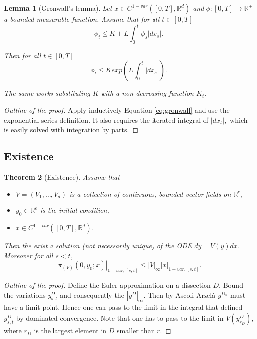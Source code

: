 \documentclass{article}
\newcommand{\R}{\mathbb{R}}
\newtheorem{theorem}{Theorem}
\newtheorem{lemma}[theorem]{Lemma}
\begin{document}
\begin{lemma}[Gronwall's lemma]
    Let $x \in C^{1-var}([0,T], \R^d)$ and $\phi:[0,T] \rightarrow \R^+$ a bounded measurable function. Assume that for all $t \in [0,T]$
    \begin{equation}\label{eq:gronwall}
        \phi_t \leq K + L \int_0^t \phi_s |dx_s|.
    \end{equation}

    Then for all $t \in [0,T]$
    \begin{equation}
        \phi_t \leq K exp\left( L \int_0^t |dx_s| \right).
    \end{equation}

    The same works substituting $K$ with a non-decreasing function $K_t.$
\end{lemma}
\begin{proof}[Outline of the proof]
    Apply inductively Equation \eqref{eq:gronwall} and use the exponential series definition.
    It also requires the iterated integral of $|dx_t|,$ which is easily solved with integration by parts.
\end{proof}

\subsection{Existence}

\begin{theorem}[Existence]
    Assume that
    \begin{itemize}
        \item $V = (V_1, \ldots, V_d)$ is a collection of continuous, bounded vector fields on $\R^e$,
        \item $y_0 \in \R^e$ is the initial condition,
        \item $x \in C^{1-var}([0,T], \R^d)$.
    \end{itemize}
    Then the exist a solution (not necessarily unique) of the ODE $dy = V(y)dx$.
    Moreover for all $s < t$,
    \begin{equation}
        |\pi_{(V)}(0, y_0; x)|_{1-var, [s,t]} \leq |V|_\infty |x|_{1-var, [s,t]}.
    \end{equation}
\end{theorem}
\begin{proof}[Outline of the proof]
    Define the Euler approximation on a dissection $D$.
    Bound the variations $y^D_{s,t}$ and consequently the $|y^D|_\infty.$
    Then by Ascoli Arzelà $y^{D_n}$ must have a limit point.
    Hence one can pass to the limit in the integral that defined $y^D_{s,t}$ by dominated convergence.
    Note that one has to pass to the limit in $V(y_{r_D}^D)$, where $r_D$ is the largest element in $D$ smaller than $r.$
\end{proof}
\end{document}
